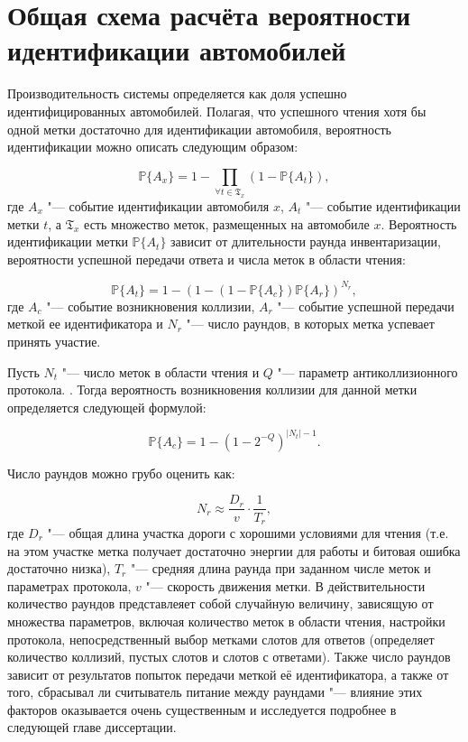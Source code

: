 \section{Общая схема расчёта вероятности идентификации автомобилей}\label{sec:ch2_general_scheme}
Производительность системы определяется как доля успешно идентифицированных автомобилей. Полагая, что успешного чтения хотя бы одной метки достаточно для идентификации автомобиля, вероятность идентификации можно описать следующим образом:

$$
	\mathbb{P}\{A_x\} = 1 - \prod\limits_{\forall t \in  \mathfrak{T}_x} (1 - \mathbb{P}\{A_t\}),
$$
где $A_x$ "--- событие идентификации автомобиля $x$, $A_t$ "--- событие идентификации метки $t$, а $\mathfrak{T}_x$ есть множество меток, размещенных на автомобиле $x$. Вероятность идентификации метки $\mathbb{P}\{A_t\}$ зависит от длительности раунда инвентаризации, вероятности успешной передачи ответа и числа меток в области чтения:

$$
	\mathbb{P}\{A_t\} = 1 - (1 - (1 - \mathbb{P}\{A_c\})\mathbb{P}\{A_r\})^{N_r},
$$
где $A_c$ "--- событие возникновения коллизии, $A_r$ "--- событие успешной передачи меткой ее идентификатора и $N_r$ "--- число раундов, в которых метка успевает принять участие.

Пусть $N_t$ "--- число меток в области чтения и $Q$ "--- параметр антиколлизионного протокола. \cite{StdGen2}. Тогда вероятность возникновения коллизии для данной метки определяется следующей формулой:

$$
	\mathbb{P}\{A_c\} = 1 - (1 - 2^{-Q})^{|N_t| - 1}.
$$

Число раундов можно грубо оценить как:

$$
	N_r \approx \frac{D_r}{v}\cdot\frac{1}{T_r},
$$
где $D_r$ "--- общая длина участка дороги с хорошими условиями для чтения (т.е. на этом участке метка получает достаточно энергии для работы и битовая ошибка достаточно низка), $T_r$ "--- средняя длина раунда при заданном числе меток и параметрах протокола, $v$ "--- скорость движения метки. В действительности количество раундов представлеяет собой случайную величину, зависящую от множества параметров, включая количество меток в области чтения, настройки протокола, непосредственный выбор метками слотов для ответов (определяет количество коллизий, пустых слотов и слотов с ответами). Также число раундов зависит от результатов попыток передачи меткой её идентификатора, а также от того, сбрасывал ли считыватель питание между раундами "--- влияние этих факторов оказывается очень существенным и исследуется подробнее в следующей главе диссертации.


